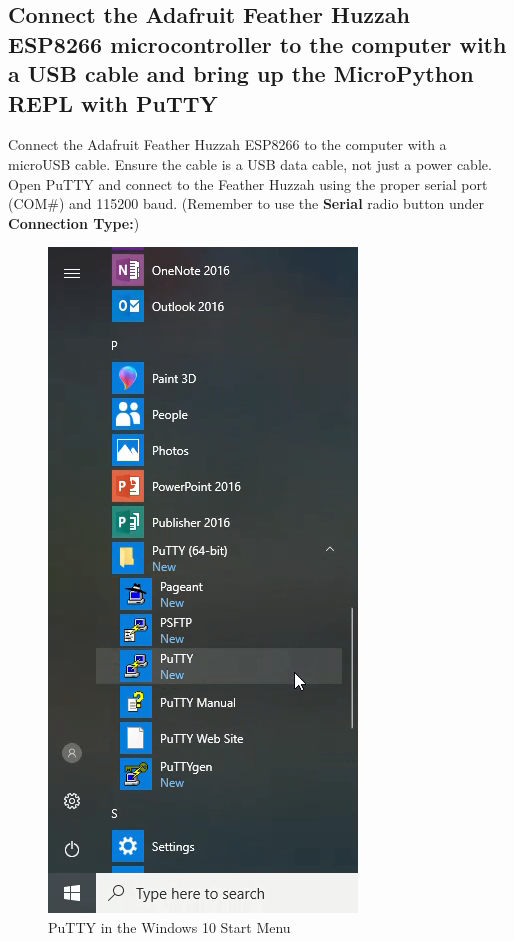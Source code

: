 \documentclass{book}
\makeatletter
\def\maxwidth{\ifdim\Gin@nat@width>\linewidth\linewidth
    \else\Gin@nat@width\fi}
\let\Oldincludegraphics\includegraphics
\renewcommand{\includegraphics}[1]{\Oldincludegraphics[width=.8\maxwidth]{#1}}
\makeatother
\begin{document}
    
        \subsection{Connect the Adafruit Feather Huzzah ESP8266 microcontroller
to the computer with a USB cable and bring up the MicroPython REPL with
PuTTY}\label{connect-the-adafruit-feather-huzzah-esp8266-microcontroller-to-the-computer-with-a-usb-cable-and-bring-up-the-micropython-repl-with-putty}
    




    
        Connect the Adafruit Feather Huzzah ESP8266 to the computer with a
microUSB cable. Ensure the cable is a USB data cable, not just a power
cable. Open PuTTY and connect to the Feather Huzzah using the proper
serial port (COM\#) and 115200 baud. (Remember to use the
\textbf{Serial} radio button under \textbf{Connection Type:})

\begin{figure}
\centering
\includegraphics{images/putty_in_start_menu.png}
\caption{PuTTY in the Windows 10 Start Menu}
\end{figure}
\end{document}
